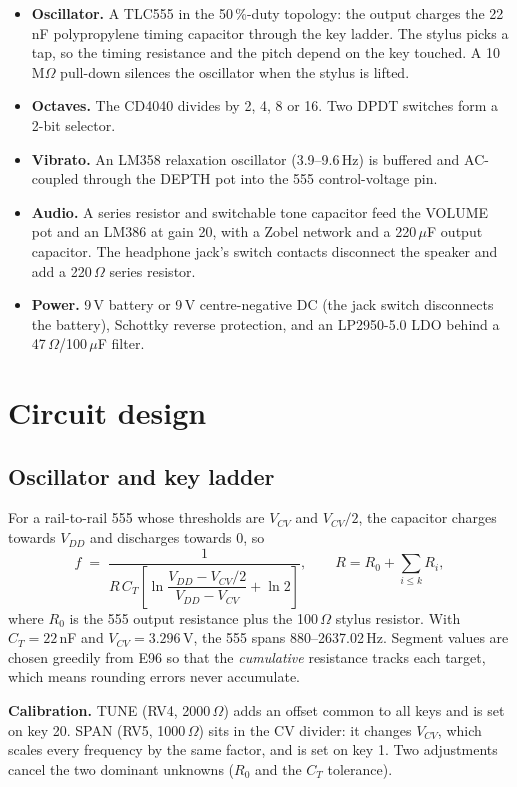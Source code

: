 \documentclass[10pt,a4paper]{article}
\begin{document}
\begin{itemize}
\item \textbf{Oscillator.} A TLC555 in the 50\,\%-duty topology: the output charges the 22\,nF polypropylene
timing capacitor through the key ladder. The stylus picks a tap, so the timing resistance and the pitch depend
on the key touched. A 10\,M$\Omega$ pull-down silences the oscillator when the stylus is lifted.
\item \textbf{Octaves.} The CD4040 divides by 2, 4, 8 or 16. Two DPDT switches form a 2-bit selector.
\item \textbf{Vibrato.} An LM358 relaxation oscillator (3.9--9.6\,Hz) is buffered and AC-coupled through the
DEPTH pot into the 555 control-voltage pin.
\item \textbf{Audio.} A series resistor and switchable tone capacitor feed the VOLUME pot and an LM386 at
gain 20, with a Zobel network and a 220\,$\mu$F output capacitor. The headphone jack's switch contacts
disconnect the speaker and add a 220\,$\Omega$ series resistor.
\item \textbf{Power.} 9\,V battery or 9\,V centre-negative DC (the jack switch disconnects the battery),
Schottky reverse protection, and an LP2950-5.0 LDO behind a 47\,$\Omega$/100\,$\mu$F filter.
\end{itemize}

\section{Circuit design}\subsection{Oscillator and key ladder}
For a rail-to-rail 555 whose thresholds are $V_{CV}$ and $V_{CV}/2$, the capacitor charges towards
$V_{DD}$ and discharges towards 0, so
\begin{equation}
f \;=\; \frac{1}{R\,C_T\left[\ln\dfrac{V_{DD}-V_{CV}/2}{V_{DD}-V_{CV}} + \ln 2\right]},
\qquad R = R_0 + \sum_{i\le k} R_i ,
\end{equation}
where $R_0$ is the 555 output resistance plus the 100\,$\Omega$ stylus resistor. With
$C_T = 22$\,nF and $V_{CV} = 3.296$\,V, the 555 spans
880--2637.02\,Hz. Segment values are chosen greedily from E96 so that
the \emph{cumulative} resistance tracks each target, which means rounding errors never accumulate.

\textbf{Calibration.} TUNE (RV4, 2000\,$\Omega$) adds an offset common to all keys and
is set on key 20. SPAN (RV5, 1000\,$\Omega$) sits in the CV divider: it changes
$V_{CV}$, which scales every frequency by the same factor, and is set on key 1. Two adjustments cancel the
two dominant unknowns ($R_0$ and the $C_T$ tolerance).
\end{document}
